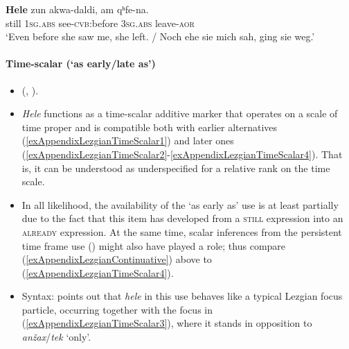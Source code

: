 \begin{exe}
	\ex\label{exAppendixLezgianContinuative}
	\gll \textbf{Hele} zun akwa-daldi, am qʰfe-na.\\
	still 1\textsc{sg}.\textsc{abs} see-\textsc{cvb}:before 3\textsc{sg}.\textsc{abs} leave-\textsc{aor}\\
	\glt \lq Even before she saw me, she left. / Noch ehe sie mich sah, ging sie weg.' \parencite[90]{Haspelmath1991}
\end{exe}

\paragraph{Time-scalar (\lq as early/late as\rq)}
\label{appendixLezgianTimeScalar}
\begin{itemize}
	\item \citeauthor{Haspelmath1991} (\citeyear{Haspelmath1991}, \citeyear[240]{Haspelmath1993}).
	\item \textit{Hele} functions as a time-scalar additive marker that operates on a scale of time proper and is compatible both with earlier alternatives (\ref{exAppendixLezgianTimeScalar1}) and later ones (\ref{exAppendixLezgianTimeScalar2}-\ref{exAppendixLezgianTimeScalar4}). That is, it can be understood as underspecified for a relative rank on the time scale.
	\item In all likelihood, the availability of  the \lq as early as\rq{ }use is at least partially due to the fact that this item has developed from a \textsc{still} expression into an \textsc{already} expression. At the same time, scalar inferences from the persistent time frame use () might also have played a role; thus compare (\ref{exAppendixLezgianContinuative}) above to (\ref{exAppendixLezgianTimeScalar4}).
	\item Syntax: \textcite{Haspelmath1991} points out that \textit{hele} in this use behaves like a typical Lezgian focus particle, occurring together with the focus in (\ref{exAppendixLezgianTimeScalar3}), where it stands in opposition to \textit{anžax}/\textit{tek} \lq only\rq{}.
\end{itemize}

